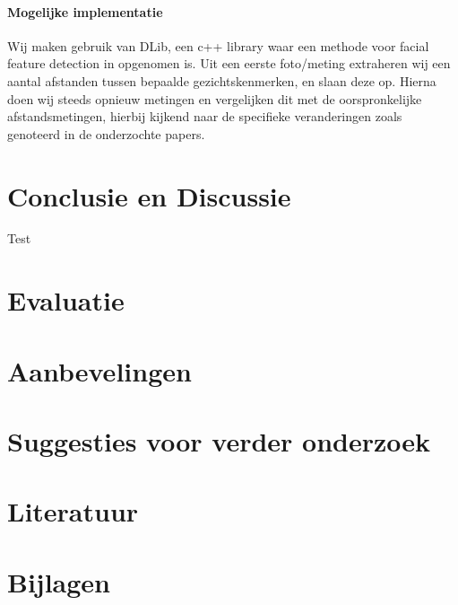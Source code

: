 \documentclass[11pt]{article}
\begin{document}
    \paragraph{Mogelijke implementatie}
    Wij maken gebruik van DLib, een c++ library waar een methode voor facial feature detection in opgenomen is.
    Uit een eerste foto/meting extraheren wij een aantal afstanden tussen bepaalde gezichtskenmerken, en slaan deze op.
    Hierna doen wij steeds opnieuw metingen en vergelijken dit met de oorspronkelijke afstandsmetingen,
    hierbij kijkend naar de specifieke veranderingen zoals genoteerd in de onderzochte papers.


    \section{Conclusie en Discussie}
    Test \citet{werner2014automatic}


    \section{Evaluatie}


    \section{Aanbevelingen}


    \section{Suggesties voor verder onderzoek}


    \section{Literatuur}


    \section{Bijlagen}



    
    
\end{document}
